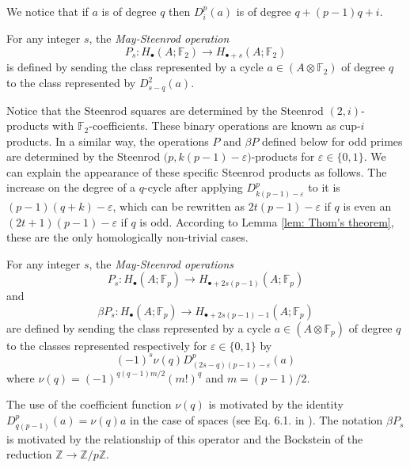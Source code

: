 We notice that if $a$ is of degree $q$ then $D^p_i(a)$ is of degree $q + (p-1)q + i$.

\begin{definition}
	For any integer $s$, the \textit{May-Steenrod operation}
	\begin{equation*}
	P_s : H_\bullet(A; \mathbb{F}_2) \to H_{\bullet + s}(A; \mathbb{F}_2)
	\end{equation*}
	is defined by sending the class represented by a cycle $a \in (A \otimes \mathbb{F}_2)$ of degree $q$ to the class represented by $D^2_{s-q}(a)$.
\end{definition}

Notice that the Steenrod squares are determined by the Steenrod $(2,i)$-products with $\mathbb{F}_2$-coefficients. These binary operations are known as cup-$i$ products. In a similar way, the operations $P$ and $\beta P$ defined below for odd primes are determined by the Steenrod $\big(p, k(p-1)-\varepsilon\big)$-products for $\varepsilon \in \{0,1\}$. We can explain the appearance of these specific Steenrod products as follows. The increase on the degree of a $q$-cycle after applying $D^p_{k(p-1)-\varepsilon}$ to it is $(p-1)(q+k) - \varepsilon$, which can be rewritten as $2t(p-1) - \varepsilon$ if $q$ is even an $(2t+1)(p-1) - \varepsilon$ if $q$ is odd. According to Lemma \ref{lem: Thom's theorem}, these are the only homologically non-trivial cases.

\begin{definition} \label{def: Steenrod operations at odd prime}
	For any integer $s$, the \textit{May-Steenrod operations}
	\begin{equation*}
	P_s : H_\bullet(A; \mathbb{F}_p) \to H_{\bullet + 2s(p-1)}(A; \mathbb{F}_p)
	\end{equation*}
	and
	\begin{equation*}
	\beta P_s : H_\bullet(A; \mathbb{F}_p) \to H_{\bullet + 2s(p-1) - 1}(A; \mathbb{F}_p)
	\end{equation*}
	are defined by sending the class represented by a cycle $a \in (A \otimes \mathbb{F}_p)$ of degree $q$ to the classes represented respectively for $\varepsilon \in\{0,1\}$ by
	\begin{equation*}
	(-1)^s \nu(q) D^p_{(2s-q)(p-1)-\varepsilon}(a)
	\end{equation*}
	where $\nu(q) = (-1)^{q(q-1)m/2}(m!)^q$ and $m = (p-1)/2$.
\end{definition}

\begin{remark}
	The use of the coefficient function $\nu(q)$ is motivated by the identity $D_{q(p-1)}^p(a) = \nu(q)a$ in the case of spaces (see Eq. 6.1. in \cite{steenrod53cyclic}). The notation $\beta P_s$ is motivated by the relationship of this operator and the Bockstein of the reduction $\mathbb Z \to \mathbb Z/p\mathbb Z$.
\end{remark}



